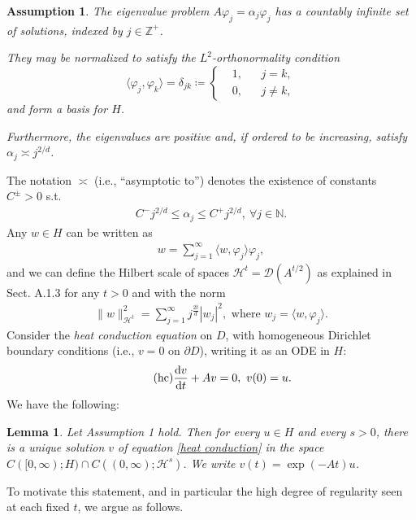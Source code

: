 \documentclass[oneside,11pt]{book}
\numberwithin{equation}{section}
\newtheorem{assumption}{Assumption}[section]
\newtheorem{lemma}{Lemma}[section]
\begin{document}
\begin{assumption}
    The eigenvalue problem $A\varphi_j = \alpha_j\varphi_j$ has a countably infinite set of solutions, indexed by $j\in\mathbb{Z}^+$.
    
    They may be normalized to satisfy the $L^2$-orthonormality condition
    \begin{equation*}
        \langle\varphi_j,\varphi_k\rangle = \delta_{jk}\coloneqq\left\{\begin{split}
            &1, &&j = k,\\
            &0, &&j\ne k,
        \end{split}\right.
    \end{equation*}
    and form a basis for $H$.
    
    Furthermore, the eigenvalues are positive and, if ordered to be increasing, satisfy $\alpha_j\asymp j^{2/d}$.
\end{assumption}
The notation $\asymp$ (i.e., ``asymptotic to'') denotes the existence of constants $C^\pm > 0$ s.t.
\begin{align*}
    C^-j^{2/d}\le\alpha_j\le C^+j^{2/d},\ \forall j\in\mathbb{N}.
\end{align*}
Any $w\in H$ can be written as
\begin{align*}
    w = \sum_{j=1}^\infty \langle w,\varphi_j\rangle\varphi_j,
\end{align*}
and we can define the Hilbert scale of spaces $\mathcal{H}^t = \mathcal{D}(A^{t/2})$ as explained in Sect. A.1.3 for any $t > 0$ and with the norm
\begin{align*}
    \|w\|_{\mathcal{H}^t}^2 = \sum_{j=1}^\infty j^{\frac{2t}{d}}|w_j|^2, \mbox{ where } w_j = \langle w,\varphi_j\rangle.
\end{align*}
Consider the \textit{heat conduction equation} on $D$, with homogeneous Dirichlet boundary conditions (i.e., $v = 0$ on $\partial D$), writing it as an ODE in $H$:
\begin{align}
    \label{heat conduction}
    \tag{hc}
    \frac{{\rm d}v}{{\rm d}t} + Av = 0,\ v(0) = u.
\end{align}
We have the following:

\begin{lemma}
    Let Assumption 1 hold. Then for every $u\in H$ and every $s > 0$, there is a unique solution $v$ of equation \eqref{heat conduction} in the space $C([0,\infty);H)\cap C((0,\infty);\mathcal{H}^s)$. We write $v(t) = \exp(-At)u$.
\end{lemma}
To motivate this statement, and in particular the high degree of regularity seen at each fixed $t$, we argue as follows.
\end{document}
